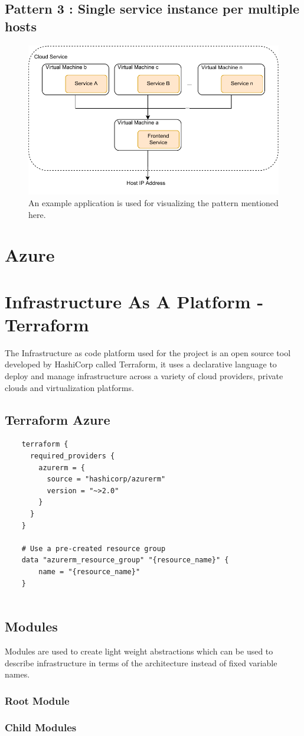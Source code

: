 \subsection{Pattern 3 : Single service instance per multiple hosts}
    \begin{figure}[H]
        \centering
        \includegraphics[width=0.8\linewidth]{images/Pattern-3.pdf}
        \caption{An example application is used for visualizing the pattern mentioned here.}
    \end{figure}  



\section{Azure}


\section{Infrastructure As A Platform -Terraform}

The Infrastructure as code platform used for the project is an open source tool developed by HashiCorp called Terraform, it uses a declarative language to deploy and manage infrastructure across a variety of cloud providers, private clouds and virtualization platforms. 


\subsection{Terraform Azure}
\begin{lstlisting}
    terraform {
      required_providers {
        azurerm = {
          source = "hashicorp/azurerm"
          version = "~>2.0"
        }
      }
    }
    
    # Use a pre-created resource group
    data "azurerm_resource_group" "{resource_name}" {
    	name = "{resource_name}"
    }
    
\end{lstlisting}

\subsection{Modules}
Modules are used to create light weight abstractions which can be used to describe infrastructure in terms of the architecture instead of fixed variable names. 
\subsubsection{Root Module}
\subsubsection{Child Modules}
